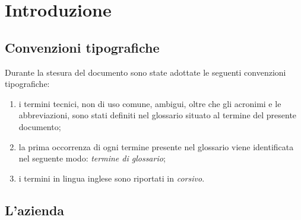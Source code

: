 \chapter{Introduzione}
\label{cap:introduzione}

\section{Convenzioni tipografiche}

Durante la stesura del documento sono state adottate le seguenti convenzioni tipografiche:
\begin{enumerate}
    \item i termini tecnici, non di uso comune, ambigui, oltre che gli acronimi e le abbreviazioni, sono stati definiti nel glossario situato al termine del presente documento;
    \item la prima occorrenza di ogni termine presente nel glossario viene identificata nel seguente modo: \emph{termine di glossario}\glsfirstoccur;
    \item i termini in lingua inglese sono riportati in \textit{corsivo}.
\end{enumerate}

\section{L'azienda}

